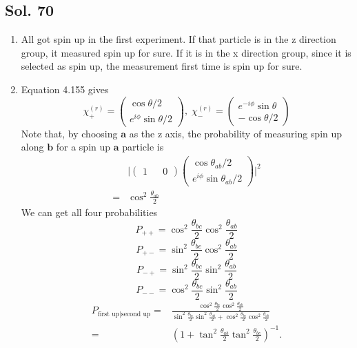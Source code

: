  \subsection*{Sol. 70}
 \begin{enumerate}
     \item 
     All got spin up in the first experiment. If that particle is in the z direction group, it measured spin up for sure. If it is in the x direction group, since it is selected as spin up, the  measurement first time is spin up for sure.
     \item 
     Equation 4.155 gives 
     $$
     \chi_+^{(r)}
     =
     \begin{pmatrix}
         \cos\theta/2\\
         e^{i\phi}
         \sin\theta/2
     \end{pmatrix},\;
     \chi_-^{(r)}
     =
     \begin{pmatrix}
         e^{-i\phi}
         \sin\theta\\
         -\cos\theta/2
     \end{pmatrix}
     $$
     Note that, by choosing $\bm a$ as the z axis, the probability of measuring spin up along $\bm b$ for a spin up $\bm a$ particle is 
     \begin{align*}
         &\bigg|
         \begin{pmatrix}
         1 && 0
     \end{pmatrix}
         \begin{pmatrix}
             \cos\theta_{ab}/2\\
             e^{i\phi}
             \sin\theta_{ab}/2
         \end{pmatrix}
         \bigg|^2\\
         =&
         \cos^2\frac{\theta_{ab}}{2}
     \end{align*}
     We can get all four probabilities 
     $$
     P_{++}
     =
    \cos^2\frac{\theta_{bc}}{2} \cos^2\frac{\theta_{ab}}{2}
     $$
     $$
     P_{+-}
     =
    \sin^2\frac{\theta_{bc}}{2} \cos^2\frac{\theta_{ab}}{2}
     $$
     $$
     P_{-+}
     =
    \sin^2\frac{\theta_{bc}}{2} \sin^2\frac{\theta_{ab}}{2}
     $$
     $$
     P_{--}
     =
    \cos^2\frac{\theta_{bc}}{2} \sin^2\frac{\theta_{ab}}{2}
     $$
     \begin{align*}
         P_{\text{first up}|\text{second up}}
         =&\frac{\cos^2\frac{\theta_{bc}}{2} \cos^2\frac{\theta_{ab}}{2}}
         {\sin^2\frac{\theta_{bc}}{2} \sin^2\frac{\theta_{ab}}{2}+\cos^2\frac{\theta_{bc}}{2} \cos^2\frac{\theta_{ab}}{2}}\\
         =&(1+\tan^2\frac{\theta_{ab}}{2}\tan^2\frac{\theta_{bc}}{2})^{-1}.
     \end{align*}
     
 \end{enumerate}
